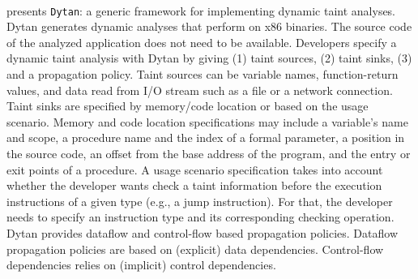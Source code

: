 \paragraph{\cite{Clause:2007:Dytan}} presents \texttt{Dytan}: a generic
framework for implementing dynamic taint analyses. Dytan generates
dynamic analyses that perform on x86 binaries. The source code of the
analyzed application does not need to be available.
Developers specify a dynamic taint analysis with Dytan by giving
(1) taint sources, (2) taint sinks, (3) and a propagation policy.
Taint sources can be variable names, function-return values, and
data read from I/O stream such as a file or a network connection.
Taint sinks are specified by memory/code location or based on the
usage scenario. Memory and code location specifications may include 
a variable's name and scope, a procedure name and the index of a formal parameter, 
a position in the source code, an offset from the base address of the program,
and the entry or exit points of a procedure.
A usage scenario specification takes into account whether the developer
wants check a taint information before the execution instructions of a given type
(e.g., a jump instruction). For that, the developer needs to
specify an instruction type and its corresponding checking operation.
Dytan provides dataflow and control-flow based propagation policies.
Dataflow propagation policies are based on (explicit) data dependencies.
Control-flow dependencies relies on (implicit) control dependencies. 

